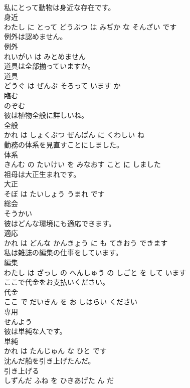 \documentclass[8pt]{extreport}
\begin{document}
\begin{CJK}{UTF8}{min}
\\	私にとって動物は身近な存在です。	
\\	身近 
\\	わたし に とって どうぶつ は みぢか な そんざい です			
\\	例外は認めません。	
\\	例外 
\\	れいがい は みとめません			
\\	道具は全部揃っていますか。	
\\	道具 
\\	どうぐ は ぜんぶ そろって います か			
\\	臨む	
\\	のぞむ			
\\	彼は植物全般に詳しいね。	
\\	全般 
\\	かれ は しょくぶつ ぜんぱん に くわしい ね			
\\	勤務の体系を見直すことにしました。	
\\	体系 
\\	きんむ の たいけい を みなおす こと に しました			
\\	祖母は大正生まれです。	
\\	大正 
\\	そぼ は たいしょう うまれ です			
\\	総会	
\\	そうかい			
\\	彼はどんな環境にも適応できます。	
\\	適応 
\\	かれ は どんな かんきょう に も てきおう できます			
\\	私は雑誌の編集の仕事をしています。	
\\	編集 
\\	わたし は ざっし の へんしゅう の しごと を して います			
\\	ここで代金をお支払いください。	
\\	代金 
\\	ここ で だいきん を お しはらい ください			
\\	専用	
\\	せんよう			
\\	彼は単純な人です。	
\\	単純 
\\	かれ は たんじゅん な ひと です			
\\	沈んだ船を引き上げたんだ。	
\\	引き上げる 
\\	しずんだ ふね を ひきあげた ん だ			

\end{CJK}
\end{document}
